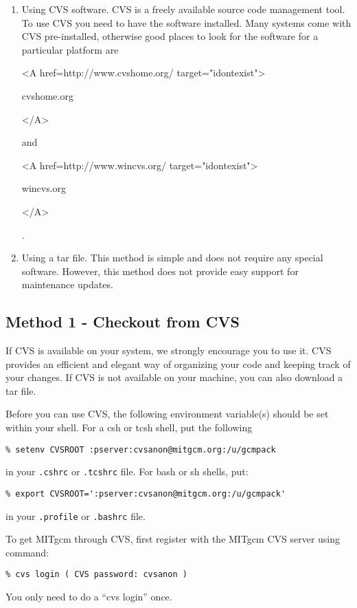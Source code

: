 \begin{enumerate}
\item Using CVS software. CVS is a freely available source code management
tool. To use CVS you need to have the software installed. Many systems
come with CVS pre-installed, otherwise good places to look for
the software for a particular platform are
\begin{rawhtml} <A href=http://www.cvshome.org/ target="idontexist"> \end{rawhtml}
cvshome.org
\begin{rawhtml} </A> \end{rawhtml}
and
\begin{rawhtml} <A href=http://www.wincvs.org/ target="idontexist"> \end{rawhtml}
wincvs.org
\begin{rawhtml} </A> \end{rawhtml}
.

\item Using a tar file. This method is simple and does not
require any special software. However, this method does not
provide easy support for maintenance updates.

\end{enumerate}

\subsection{Method 1 - Checkout from CVS}
\label{sect:cvs_checkout}

If CVS is available on your system, we strongly encourage you to use it. CVS
provides an efficient and elegant way of organizing your code and keeping
track of your changes. If CVS is not available on your machine, you can also
download a tar file.

Before you can use CVS, the following environment variable(s) should
be set within your shell.  For a csh or tcsh shell, put the following 
\begin{verbatim}
% setenv CVSROOT :pserver:cvsanon@mitgcm.org:/u/gcmpack
\end{verbatim}
in your \texttt{.cshrc} or \texttt{.tcshrc} file.  For bash or sh
shells, put:
\begin{verbatim}
% export CVSROOT=':pserver:cvsanon@mitgcm.org:/u/gcmpack'
\end{verbatim}
in your \texttt{.profile} or \texttt{.bashrc} file.


To get MITgcm through CVS, first register with the MITgcm CVS server
using command:
\begin{verbatim}
% cvs login ( CVS password: cvsanon )
\end{verbatim}
You only need to do a ``cvs login'' once.

